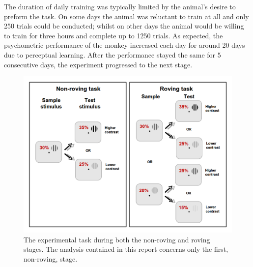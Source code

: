 The duration of daily training was typically limited by the animal's desire to preform the task. On some days the animal was reluctant to train at all and only 250 trials could be conducted; whilst on other days the animal would be willing to train for three hours and complete up to 1250 trials.
As expected, the psychometric performance of the monkey increased each day for around 20 days due to perceptual learning. After the performance stayed the same for 5 consecutive days, the experiment progressed to the next stage.


\begin{figure}[htbp]
\begin{center}
\includegraphics[width=0.8\linewidth]{./figs/PLtask2.png}
\end{center}
\caption{\small{}The experimental task during both the non-roving and roving stages. The analysis contained in this report concerns only the first, non-roving, stage.}
\label{fig:pltask2}
\end{figure}


